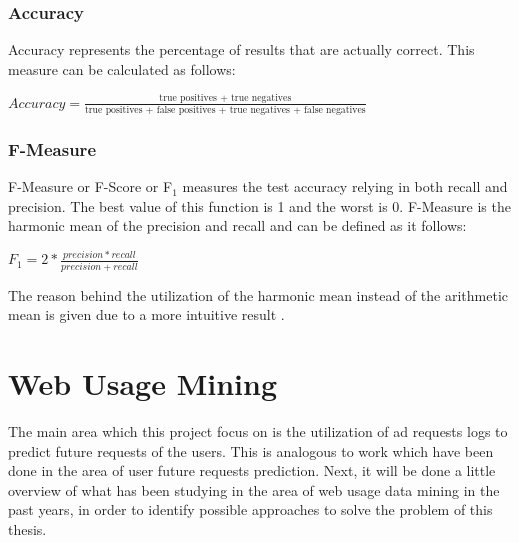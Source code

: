 \subsubsection{Accuracy}

Accuracy represents the percentage of results that are actually correct. This
measure can be calculated as follows:

\begin{center}
\Large
\begin{math}
Accuracy = \frac{\text{true positives + true negatives}}{\text{true positives + false positives + true negatives + false negatives}}
\end{math}
\normalsize
\end{center}


\subsubsection{F-Measure}

F-Measure or F-Score or F\begin{math}_1 \end{math} measures the test accuracy relying in both recall
and precision. The best value of this function is 1 and the worst is 0.
F-Measure is the harmonic mean of the precision and recall and can be defined as
it follows:

\begin{center}
\Large
\begin{math}
F_1 = 2 * \frac{precision*recall}{precision+recall}
\end{math}
\normalsize
\end{center}

The reason behind the utilization of the harmonic mean instead of the arithmetic mean
is given due to a more intuitive result \cite{sasaki2007truth}.



\section{Web Usage Mining}\label{sec:network}

\nocite{UjwalaPatil}

The main area which this project focus on is the utilization of ad requests logs
to predict future requests of the users. This is analogous to work
which have been done in the area of user future requests prediction.
Next, it will be done a little overview of what has been studying in the area of web
usage data mining in the past years, in order to identify possible approaches
to solve the problem of this thesis.

